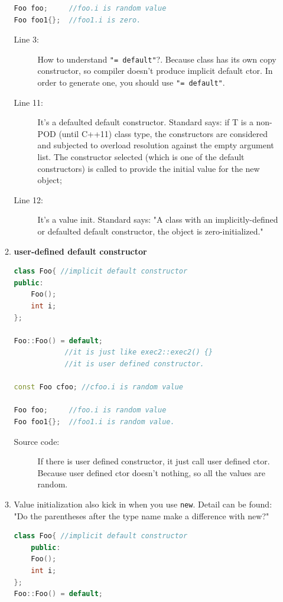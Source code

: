 \documentclass[a4paper,11pt,twoside]{book}
\begin{document}
\begin{itemize}
\begin{enumerate}
\begin{lstlisting}[frame=single, language=c++]
Foo foo;     //foo.i is random value
Foo foo1{};	 //foo1.i is zero.		 
\end{lstlisting}
\begin{description}			
	\item[Line 3:]  How to understand \texttt{"= default"}?. Because class has its own copy constructor, so compiler doesn't produce implicit default ctor. In order to generate one, you should use \texttt{"= default"}.
	
	\item[Line 11:] It's a defaulted default constructor.  Standard says: if T is a non-POD (until C++11) class type, the constructors are considered and subjected to overload resolution against the empty argument list. The constructor selected (which is one of the default constructors) is called to provide the initial value for the new object;
	
	\item[Line 12:] It's a value init. Standard says: "A class with an implicitly-defined or defaulted default constructor, the object is zero-initialized."
\end{description}


		\item \textbf{user-defined default constructor}
\begin{lstlisting}[frame=single, language=c++]
class Foo{ //implicit default constructor
public:
	Foo();
	int i;
};

Foo::Foo() = default; 
			//it is just like exec2::exec2() {}
			//it is user defined constructor.
			
const Foo cfoo; //cfoo.i is random value 
			
Foo foo;     //foo.i is random value
Foo foo1{};	 //foo1.i is random value.		 
\end{lstlisting}
\begin{description}			
	\item[Source code:] If there is user defined constructor, it just call user defined ctor. Because user defined ctor doesn't nothing, so all the values are random.
\end{description}
				
 
	\item Value initialization also kick in when you use \texttt{new}. Detail can be found: "Do the parentheses after the type name make a difference with new?"
	
\begin{lstlisting}[frame=single, language=c++]
class Foo{ //implicit default constructor
	public:
	Foo();
	int i;
};
Foo::Foo() = default; 	


\end{lstlisting}
\end{enumerate}
\end{itemize}
\end{document}
